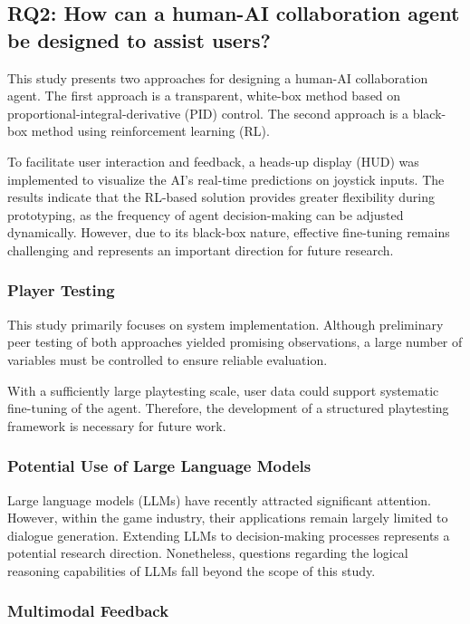 \subsection{RQ2: How can a human-AI collaboration agent be designed to assist users?}

This study presents two approaches for designing a human-AI collaboration agent. The first approach is a transparent, white-box method based on proportional-integral-derivative (PID) control. The second approach is a black-box method using reinforcement learning (RL).

To facilitate user interaction and feedback, a heads-up display (HUD) was implemented to visualize the AI's real-time predictions on joystick inputs. The results indicate that the RL-based solution provides greater flexibility during prototyping, as the frequency of agent decision-making can be adjusted dynamically. However, due to its black-box nature, effective fine-tuning remains challenging and represents an important direction for future research.

\subsubsection{Player Testing}

This study primarily focuses on system implementation. Although preliminary peer testing of both approaches yielded promising observations, a large number of variables must be controlled to ensure reliable evaluation.

With a sufficiently large playtesting scale, user data could support systematic fine-tuning of the agent. Therefore, the development of a structured playtesting framework is necessary for future work.

\subsubsection{Potential Use of Large Language Models}

Large language models (LLMs) have recently attracted significant attention. However, within the game industry, their applications remain largely limited to dialogue generation. Extending LLMs to decision-making processes represents a potential research direction. Nonetheless, questions regarding the logical reasoning capabilities of LLMs fall beyond the scope of this study.

\subsubsection{Multimodal Feedback}

